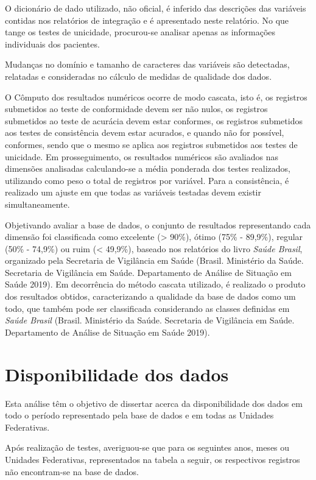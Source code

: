 \documentclass[
  12,
  table]{proadi}
\begin{document}
O dicionário de dado utilizado, não oficial, é inferido das descrições
das variáveis contidas nos relatórios de integração e é apresentado
neste relatório. No que tange os testes de unicidade, procurou-se
analisar apenas as informações individuais dos pacientes.

Mudanças no domínio e tamanho de caracteres das variáveis são
detectadas, relatadas e consideradas no cálculo de medidas de qualidade
dos dados.

O Cômputo dos resultados numéricos ocorre de modo cascata, isto é, os
registros submetidos ao teste de conformidade devem ser não nulos, os
registros submetidos ao teste de acurácia devem estar conformes, os
registros submetidos aos testes de consistência devem estar acurados, e
quando não for possível, conformes, sendo que o mesmo se aplica aos
registros submetidos aos testes de unicidade. Em prosseguimento, os
resultados numéricos são avaliados nas dimensões analisadas
calculando-se a média ponderada dos testes realizados, utilizando como
peso o total de registros por variável. Para a consistência, é realizado
um ajuste em que todas as variáveis testadas devem existir
simultaneamente.

Objetivando avaliar a base de dados, o conjunto de resultados
representando cada dimensão foi classificada como excelente
(\textgreater{} 90\%), ótimo (75\% - 89,9\%), regular (50\% - 74,9\%) ou
ruim (\textless{} 49,9\%), baseado nos relatórios do livro \emph{Saúde
Brasil}, organizado pela Secretaria de Vigilância em Saúde (Brasil.
Ministério da Saúde. Secretaria de Vigilância em Saúde. Departamento de
Análise de Situação em Saúde 2019). Em decorrência do método cascata
utilizado, é realizado o produto dos resultados obtidos, caracterizando
a qualidade da base de dados como um todo, que também pode ser
classificada considerando as classes definidas em \emph{Saúde Brasil}
(Brasil. Ministério da Saúde. Secretaria de Vigilância em Saúde.
Departamento de Análise de Situação em Saúde 2019).

\hypertarget{disponibilidade-dos-dados}{%
\section{Disponibilidade dos dados}\label{disponibilidade-dos-dados}}

Esta análise têm o objetivo de dissertar acerca da disponibilidade dos
dados em todo o período representado pela base de dados e em todas as
Unidades Federativas.

Após realização de testes, averiguou-se que para os seguintes anos,
meses ou Unidades Federativas, representados na tabela a seguir, os
respectivos registros não encontram-se na base de dados.
\end{document}
